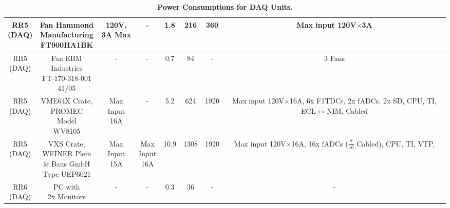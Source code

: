 \documentclass[10pt]{article}
\begin{document}
\begin{table}[h]
\begin{tabular}{|cccccccc|}
        \hline
        \makecell{RR5\\ (DAQ)} & \makecell{Fan Hammond\\ Manufacturing\\ FT900HA1BK} & \makecell{120V,\\ 3A Max} & - & 1.8 & 216 & 360 & \makecell{Max input\\ 120V$\times$3A}\\
        \hline
        \makecell{RR5\\ (DAQ)} & \makecell{Fan EBM\\ Industries\\ FT-170-318-001\\ 41/05} & - & - & 0.7 & 84 & - & 3 Fans\\
        \hline
        \makecell{RR5\\ (DAQ)} & \makecell{VME64X Crate,\\ PROMEC Model\\ WV8105} & \makecell{Max Input\\ 16A} & - & 5.2 & 624 & 1920 & \makecell{Max input\\ 120V$\times$16A,\\ 6x F1TDCs,\\ 2x fADCs,\\ 2x SD,\\CPU, TI,\\ECL$\leftrightarrow$NIM,\\ Cabled}\\
        \hline
        \makecell{RR5\\ (DAQ)} & \makecell{VXS Crate,\\ WEINER Plein\\ \& Baus GmbH\\ Type UEP6021} & \makecell{Max Input\\ 15A} & \makecell{Max\\ Input\\ 16A} & 10.9 & 1308 & 1920 & \makecell{Max input\\ 120V$\times$16A,\\ 16x fADCs\\ ($\frac{7}{16}$ Cabled),\\ CPU, TI,\\ VTP,} \\
        \hline
        \makecell{RR6\\ (DAQ)} & \makecell{PC with\\ 2x Monitors} & - & - & 0.3 & 36 & - & -\\
        \hline                                                                 
    \end{tabular}
    \caption{\textbf{Power Consumptions for DAQ Units.}}
    \label{tab:DAQ}
\end{table}
\end{document}
